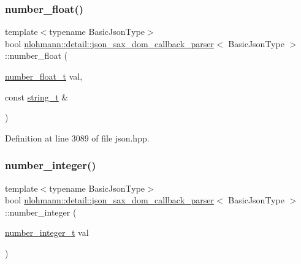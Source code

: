 \subsubsection{\texorpdfstring{number\_float()}{number\_float()}}
{\footnotesize\ttfamily template$<$typename Basic\+Json\+Type$>$ \\
bool \mbox{\hyperlink{classnlohmann_1_1detail_1_1json__sax__dom__callback__parser}{nlohmann\+::detail\+::json\+\_\+sax\+\_\+dom\+\_\+callback\+\_\+parser}}$<$ Basic\+Json\+Type $>$\+::number\+\_\+float (\begin{DoxyParamCaption}\item[{\mbox{\hyperlink{classnlohmann_1_1detail_1_1json__sax__dom__callback__parser_a914ea0555cea5290449fb791ae41c655}{number\+\_\+float\+\_\+t}}}]{val,  }\item[{const \mbox{\hyperlink{classnlohmann_1_1detail_1_1json__sax__dom__callback__parser_a00e7d95d82d5d8a43421526a42a8eabc}{string\+\_\+t}} \&}]{ }\end{DoxyParamCaption})\hspace{0.3cm}{\ttfamily [inline]}}



Definition at line 3089 of file json.\+hpp.

\mbox{\label{classnlohmann_1_1detail_1_1json__sax__dom__callback__parser_a68d9eddfd572e8687c1c8107e0505aa6}} 
\subsubsection{\texorpdfstring{number\_integer()}{number\_integer()}}
{\footnotesize\ttfamily template$<$typename Basic\+Json\+Type$>$ \\
bool \mbox{\hyperlink{classnlohmann_1_1detail_1_1json__sax__dom__callback__parser}{nlohmann\+::detail\+::json\+\_\+sax\+\_\+dom\+\_\+callback\+\_\+parser}}$<$ Basic\+Json\+Type $>$\+::number\+\_\+integer (\begin{DoxyParamCaption}\item[{\mbox{\hyperlink{classnlohmann_1_1detail_1_1json__sax__dom__callback__parser_a3ba8fc7a8d83c5b0eeb3b543ad844b8d}{number\+\_\+integer\+\_\+t}}}]{val }\end{DoxyParamCaption})\hspace{0.3cm}{\ttfamily [inline]}}



